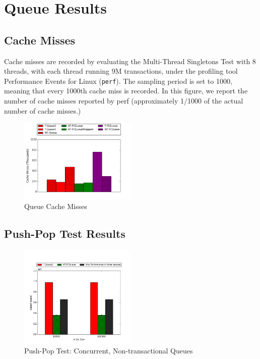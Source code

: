 \chapter{Queue Results}
\label{app:queue}

\section{Cache Misses}

Cache misses are recorded by evaluating the Multi-Thread Singletons Test with 8 threads, with each thread running 9M transactions, under the profiling tool Performance Events for Linux (\texttt{perf}). The sampling period is set to 1000, meaning that every 1000th cache miss is recorded.
In this figure, we report the number of cache misses reported by perf (approximately 1/1000 of the actual number of cache misses.)

\begin{figure}[H]
    \centering
    \includegraphics[width=0.5\textwidth]{fcqueues/cm.png}
    \caption{Queue Cache Misses}
\label{fig:cm_queues}
\end{figure}

\section{Push-Pop Test Results}
\label{app:queue_pp}

\begin{figure}[H]
    \centering
    \includegraphics[width=0.5\textwidth]{concurrent/Q:PushPop.png}
    \caption{Push-Pop Test: Concurrent, Non-transactional Queues}
    \label{fig:concurrentqs_pushpop}
\end{figure}

